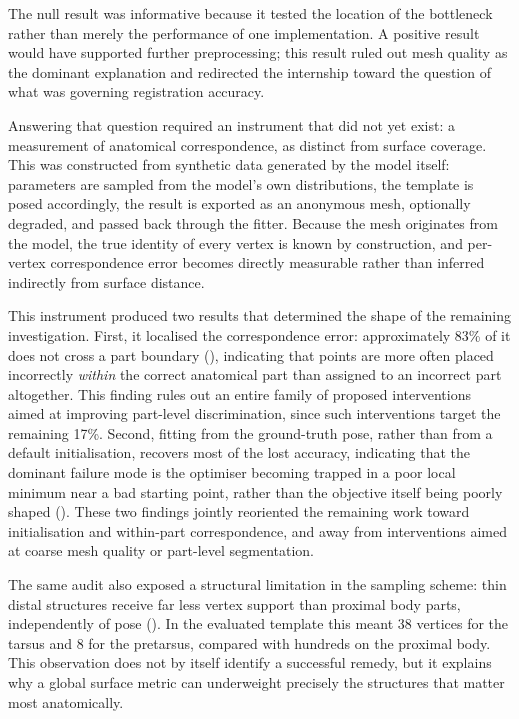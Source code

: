 The null result was informative because it tested the location of the
bottleneck rather than merely the performance of one implementation. A
positive result would have supported further preprocessing; this result ruled
out mesh quality as the dominant explanation and redirected the internship
toward the question of what was governing registration accuracy.

Answering that question required an instrument that did not yet exist: a
measurement of anatomical correspondence, as distinct from surface coverage.
This was constructed from synthetic data generated by the model itself:
parameters are sampled from the model's own distributions, the template is
posed accordingly, the result is exported as an anonymous mesh, optionally
degraded, and passed back through the fitter. Because the mesh originates from
the model, the true identity of every vertex is known by construction, and
per-vertex correspondence error becomes directly measurable rather than
inferred indirectly from surface distance.

This instrument produced two results that determined the shape of the
remaining investigation. First, it localised the correspondence error:
approximately 83\% of it does not cross a part boundary (), indicating
that points are more often placed incorrectly \emph{within} the correct
anatomical part than assigned to an incorrect part altogether. This finding
rules out an entire family of proposed interventions aimed at improving
part-level discrimination, since such interventions target the remaining
17\%. Second, fitting from the ground-truth pose, rather than from a default
initialisation, recovers most of the lost accuracy, indicating that the
dominant failure mode is the optimiser becoming trapped in a poor local
minimum near a bad starting point, rather than the objective itself being
poorly shaped (). These two findings jointly reoriented the remaining
work toward initialisation and within-part correspondence, and away from
interventions aimed at coarse mesh quality or part-level segmentation.

The same audit also exposed a structural limitation in the sampling scheme:
thin distal structures receive far less vertex support than proximal body
parts, independently of pose (). In the evaluated template this meant
38 vertices for the tarsus and 8 for the pretarsus, compared with hundreds on
the proximal body. This observation does not by itself identify a successful
remedy, but it explains why a global surface metric can underweight precisely
the structures that matter most anatomically.

